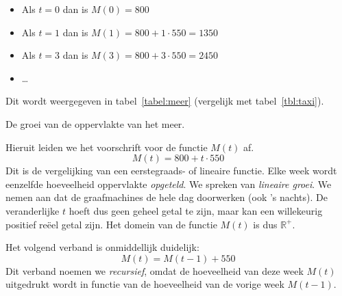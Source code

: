 \begin{itemize}
    \item  Als $t=0$ dan is $M(0)=800$

    \item  Als $t=1$ dan is $M(1)=800+1\cdot 550=1350$

    \item  Als $t=3$ dan is $M(3)=800+3\cdot 550=2450$

    \item  \ldots
\end{itemize}
 Dit wordt weergegeven in tabel~\ref{tabel:meer} (vergelijk met tabel~\ref{tbl:taxi}).
 \begin{table}[htb]
    \centering
    \vspace{0.3cm}
        \caption{De groei van de oppervlakte  van het meer.}
\label{tabel:meer}
 \end{table}
 
\noindent
Hieruit leiden we  het voorschrift voor de functie $M(t)$ af.
\begin{displaymath}
    M(t)=800+t\cdot 550
\end{displaymath}
Dit is de vergelijking van  een eerstegraads- of lineaire functie. Elke week wordt  eenzelfde hoeveelheid oppervlakte \emph{opgeteld}. We spreken van \emph{lineaire groei}. We nemen aan dat de graafmachines de hele dag doorwerken (ook 's nachts). De veranderlijke $t$ hoeft dus geen geheel getal te zijn, maar kan een willekeurig positief reëel getal zijn. Het domein van de functie $M(t)$ is dus $\mathbb{R}^+$. 


Het volgend verband is onmiddellijk duidelijk:
\begin{displaymath}
    M(t)=M(t-1) +550
\end{displaymath}
 Dit verband noemen we \emph{recursief}, omdat de hoeveelheid van deze  week $M(t)$ uitgedrukt wordt in functie van de hoeveelheid van de vorige week $M(t-1)$.


